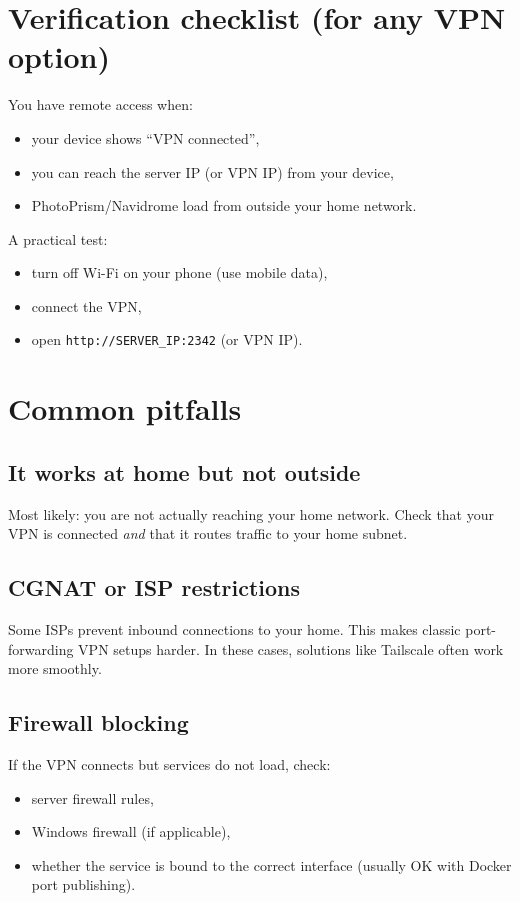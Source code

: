 \section{Verification checklist (for any VPN option)}
You have remote access when:
\begin{itemize}[leftmargin=*]
  \item your device shows ``VPN connected'',
  \item you can reach the server IP (or VPN IP) from your device,
  \item PhotoPrism/Navidrome load from outside your home network.
\end{itemize}

A practical test:
\begin{itemize}[leftmargin=*]
  \item turn off Wi-Fi on your phone (use mobile data),
  \item connect the VPN,
  \item open \texttt{http://SERVER\_IP:2342} (or VPN IP).
\end{itemize}

\section{Common pitfalls}
\subsection*{It works at home but not outside}
Most likely: you are not actually reaching your home network.
Check that your VPN is connected \emph{and} that it routes traffic to your home subnet.

\subsection*{CGNAT or ISP restrictions}
Some ISPs prevent inbound connections to your home. This makes classic port-forwarding VPN setups harder.
In these cases, solutions like Tailscale often work more smoothly.

\subsection*{Firewall blocking}
If the VPN connects but services do not load, check:
\begin{itemize}[leftmargin=*]
  \item server firewall rules,
  \item Windows firewall (if applicable),
  \item whether the service is bound to the correct interface (usually OK with Docker port publishing).
\end{itemize}

